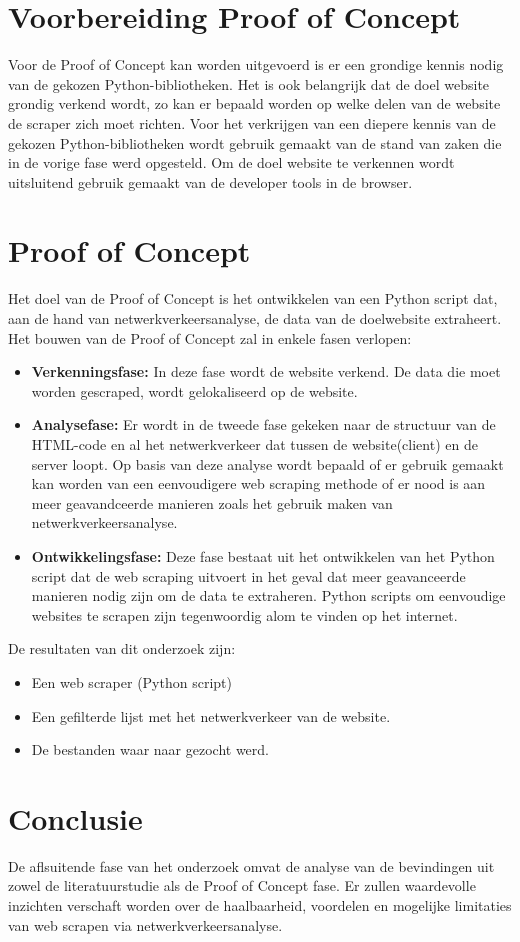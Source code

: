 \section{Voorbereiding Proof of Concept}
Voor de Proof of Concept kan worden uitgevoerd is er een grondige kennis nodig van de gekozen Python-bibliotheken. Het is ook belangrijk dat de doel website grondig verkend wordt, zo kan er bepaald worden op welke  delen van de website de scraper zich moet richten. Voor het verkrijgen van een diepere kennis van de gekozen Python-bibliotheken wordt gebruik gemaakt van de stand van zaken die in de vorige fase werd opgesteld. Om de doel website te verkennen wordt uitsluitend gebruik gemaakt van de developer tools in de browser.

\section{Proof of Concept}
Het doel van de Proof of Concept is het ontwikkelen van een Python script dat, aan de hand van netwerkverkeersanalyse, de data van de doelwebsite extraheert.
Het bouwen van de Proof of Concept zal in enkele fasen verlopen:
\begin{itemize}
    \item \textbf{Verkenningsfase:} In deze fase wordt de website verkend. De data die moet worden gescraped, wordt gelokaliseerd op de website.

    \item \textbf{Analysefase:} Er wordt in de tweede fase gekeken naar de structuur van de HTML-code en al het netwerkverkeer dat tussen de website(client) en de server loopt. Op basis van deze analyse wordt bepaald of er gebruik gemaakt kan worden van een eenvoudigere web scraping methode of er nood is aan meer geavandceerde manieren zoals het gebruik maken van netwerkverkeersanalyse.

    \item \textbf{Ontwikkelingsfase:} Deze fase bestaat uit het ontwikkelen van het Python script dat de web scraping uitvoert in het geval dat meer geavanceerde manieren nodig zijn om de data te extraheren. Python scripts om eenvoudige websites te scrapen zijn tegenwoordig alom te vinden op het internet.

\end{itemize}
 De resultaten van dit onderzoek zijn:
\begin{itemize}
    \item Een web scraper (Python script)
    \item Een gefilterde lijst met het netwerkverkeer van de website.
    \item De bestanden waar naar gezocht werd.
\end{itemize}

\section{Conclusie}
De aflsuitende fase van het onderzoek omvat de analyse van de bevindingen uit zowel de literatuurstudie als de Proof of Concept fase. Er zullen waardevolle inzichten verschaft worden over de haalbaarheid, voordelen en mogelijke limitaties van web scrapen via netwerkverkeersanalyse.
